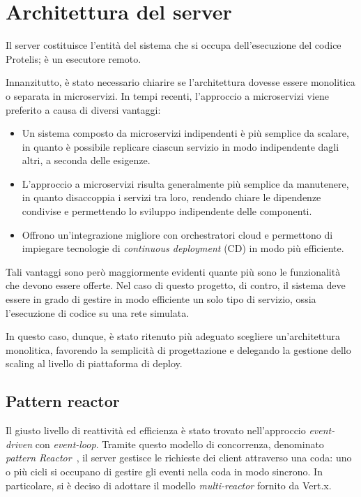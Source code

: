  \section{Architettura del server}\label{sec:arch:server}

    Il server costituisce l'entità del sistema che si occupa dell'esecuzione del codice Protelis; è un esecutore remoto.

    Innanzitutto, è stato necessario chiarire se l'architettura dovesse essere monolitica o separata in microservizi.
    In tempi recenti, l'approccio a microservizi viene preferito a causa di diversi vantaggi:

    \begin{itemize}
      \item
        Un sistema composto da microservizi indipendenti è più semplice da scalare,
        in quanto è possibile replicare ciascun servizio in modo indipendente dagli altri, a seconda delle esigenze.
      \item
        L'approccio a microservizi risulta generalmente più semplice da manutenere,
        in quanto disaccoppia i servizi tra loro, rendendo chiare le dipendenze condivise e permettendo lo sviluppo indipendente delle componenti.
      \item
        Offrono un'integrazione migliore con orchestratori cloud e permettono di impiegare tecnologie di \emph{continuous deployment} (CD) in modo più efficiente.
    \end{itemize}

    Tali vantaggi sono però maggiormente evidenti quante più sono le funzionalità che devono essere offerte.
    Nel caso di questo progetto, di contro, il sistema deve essere in grado di gestire in modo efficiente un solo tipo di servizio, ossia l'esecuzione di codice su una rete simulata.

    In questo caso, dunque, è stato ritenuto più adeguato scegliere un'architettura monolitica, favorendo la semplicità di progettazione
    e delegando la gestione dello scaling al livello di piattaforma di deploy.

    \subsection{Pattern reactor}\label{subsec:reactor}

      Il giusto livello di reattività ed efficienza è stato trovato nell'approccio \emph{event-driven} con \emph{event-loop}.
      Tramite questo modello di concorrenza, denominato \emph{pattern Reactor}~\cite{Schmidt1995ReactorAO}, il server gestisce le richieste dei client attraverso una coda:
      uno o più cicli si occupano di gestire gli eventi nella coda in modo sincrono.
      In particolare, si è deciso di adottare il modello \emph{multi-reactor} fornito da Vert.x.

